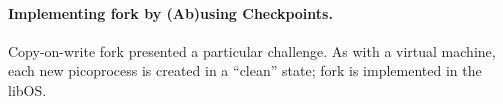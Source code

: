 


\begin{comment}
\vspace{5pt}
\noindent{\bf Guest self-migration.~}  One of the key features of the host ABI
is that guest state can be programmatically read and recreated.
As a result, guests can checkpoint, migrate, and resume themselves in a new picoprocess,
potentially on a new host.  
Most of the library OS and application state are checkpointed simply 
by copying the contents of virtual memory into a file.
Checkpointing requires manually serializing a few key data structures
in {\tt libLinux} that are needed to resume the library OS from a checkpoint,
including the thread states, handle table, and memory mappings.  

Resuming from a checkpoint involves restoring these key data
structures (handles, thread register contexts, memory mappings), and re-loading memory
contents from the checkpoint.  Most additional data structures
in {\tt libLinux}, and all application data structures,
are reloaded at the virtual address as before the checkpoint and work without modification.
\end{comment}

\begin{comment}
When a new guest begins execution, an input argument to {\tt libLinux} indicates
whether control should be transferred to the Linux loader ({\tt ld.so}) to start a new application instance, 
or whether a checkpoint should be loaded instead.
\end{comment}

\paragraph{Implementing fork by (Ab)using Checkpoints.} 
Copy-on-write fork presented a particular challenge.
As with a virtual machine, each new picoprocess 
is created in a ``clean'' state; fork is implemented in the libOS.


